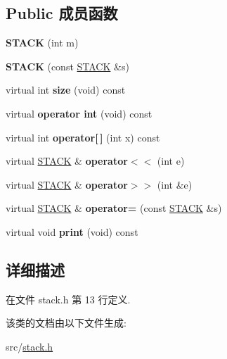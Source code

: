 \subsection*{Public 成员函数}
\begin{DoxyCompactItemize}
\item 
{\bfseries S\+T\+A\+CK} (int m)\hypertarget{classSTACK_a05bc9d50ad557a3674c526a89e86e448}{}\label{classSTACK_a05bc9d50ad557a3674c526a89e86e448}

\item 
{\bfseries S\+T\+A\+CK} (const \hyperlink{classSTACK}{S\+T\+A\+CK} \&s)\hypertarget{classSTACK_a3378f08d7a0a6eda56e19cec7259e188}{}\label{classSTACK_a3378f08d7a0a6eda56e19cec7259e188}

\item 
virtual int {\bfseries size} (void) const \hypertarget{classSTACK_a2c64a2e35765b1120870e5bd768a6094}{}\label{classSTACK_a2c64a2e35765b1120870e5bd768a6094}

\item 
virtual {\bfseries operator int} (void) const \hypertarget{classSTACK_aefb6f31671a86cedb35642f718999655}{}\label{classSTACK_aefb6f31671a86cedb35642f718999655}

\item 
virtual int {\bfseries operator\mbox{[}$\,$\mbox{]}} (int x) const \hypertarget{classSTACK_af623ee48118d6b41b13e37d8d90d76ac}{}\label{classSTACK_af623ee48118d6b41b13e37d8d90d76ac}

\item 
virtual \hyperlink{classSTACK}{S\+T\+A\+CK} \& {\bfseries operator$<$$<$} (int e)\hypertarget{classSTACK_ae0163e70963b3dc5b585ebddfa145542}{}\label{classSTACK_ae0163e70963b3dc5b585ebddfa145542}

\item 
virtual \hyperlink{classSTACK}{S\+T\+A\+CK} \& {\bfseries operator$>$$>$} (int \&e)\hypertarget{classSTACK_a8581b5dd2195110a1baa0bc39b222db7}{}\label{classSTACK_a8581b5dd2195110a1baa0bc39b222db7}

\item 
virtual \hyperlink{classSTACK}{S\+T\+A\+CK} \& {\bfseries operator=} (const \hyperlink{classSTACK}{S\+T\+A\+CK} \&s)\hypertarget{classSTACK_af05d024de2a827a1812b2860bc86b65a}{}\label{classSTACK_af05d024de2a827a1812b2860bc86b65a}

\item 
virtual void {\bfseries print} (void) const \hypertarget{classSTACK_a7fbad0471b86e1572c19c91c11389e5f}{}\label{classSTACK_a7fbad0471b86e1572c19c91c11389e5f}

\end{DoxyCompactItemize}


\subsection{详细描述}


在文件 stack.\+h 第 13 行定义.



该类的文档由以下文件生成\+:\begin{DoxyCompactItemize}
\item 
src/\hyperlink{stack_8h}{stack.\+h}\end{DoxyCompactItemize}
